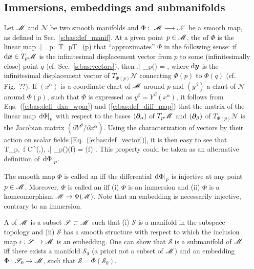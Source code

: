 \subsection{Immersions, embeddings and submanifolds} \label{s:bas:embed}

Let $\mathscr{M}$ and $\mathscr{N}$ be two smooth manifolds
and $\Phi:\ \mathscr{M} \longrightarrow \mathscr{N}$
be a smooth map, as defined in Sec.~\ref{s:bas:def_manif}.
At a given point $p\in\mathscr{M}$, the 
of $\Phi$ is the linear map
\be
    \left.\D\Phi \right| _p:\ T_p\M \longrightarrow T_{\Phi(p)}
\ee
that ``approximates'' $\Phi$ in the following sense: if $\mathrm{d}\bm{x}\in T_p\mathscr{M}$ is the
infinitesimal displacement vector from $p$ to some (infinitesimally close) point $q$
(cf. Sec.~\ref{s:bas:vectors}), then
\be \label{e:bas:def_diff_map}
    \left.\D\Phi \right| _p(\D{}) = \D{},
\ee
where $\mathrm{d}\bm{y}$ is the infinitesimal displacement vector of $T_{\Phi(p)}\mathscr{N}$
connecting $\Phi(p)$ to $\Phi(q)$ (cf. Fig.~??).
If $(x^\alpha)$ is a coordinate chart of $\mathscr{M}$ around $p$ and $(y^\beta)$ a chart
of $\mathscr{N}$ around $\Phi(p)$, such that $\Phi$ is expressed as
$y^\beta = Y^\beta(x^\alpha)$, it follows from Eqs.~(\ref{e:bas:dell_dxa_wpar}) and
(\ref{e:bas:def_diff_map}) that
the matrix of the linear map $\left.\mathrm{d}\Phi \right| _p$
with respect to the bases $(\bm{\partial}_\alpha)$ of $T_p\mathscr{M}$ and $(\bm{\partial}_\beta)$ of $T_{\Phi(p)}\mathscr{N}$
is the Jacobian matrix $(\partial Y^\beta / \partial x^\alpha)$.
Using the characterization of vectors by their action on scalar fields
[Eq.~(\ref{e:bas:def_vector})], it is then easy to see
that
\be
    \forall {}\in T_p\M,\ \forall f \in C^\infty(,),\quad
    \left.\D\Phi \right| _p()(f) =
        \left(f\circ \Phi \right) .
\ee
This property could be taken as an alternative definition of $\left.\mathrm{d}\Phi \right| _p$.

The smooth map $\Phi$ is called an  iff
the differential $\left.\mathrm{d}\Phi \right| _p$ is injective at any point $p\in\mathscr{M}$.
Moreover, $\Phi$ is called an  iff (i) $\Phi$
is an immersion and (ii) $\Phi$ is a homeomorphism $\mathscr{M} \rightarrow \Phi(\mathscr{M})$.
Note that an embedding is necessarily injective, contrary to an immersion.

A  of $\mathscr{M}$ is a subset $\mathscr{S}\subset \mathscr{M}$ such
that (i) $\mathscr{S}$ is a manifold in the subspace topology and (ii)
$\mathscr{S}$ has a smooth structure with respect to which
the inclusion map $\iota: \mathscr{S} \rightarrow \mathscr{M}$ is an embedding.
One can show that $\mathscr{S}$ is a submanifold of $\mathscr{M}$ iff there exists
a manifold $\mathscr{S}_0$ (a priori not a subset of $\mathscr{M}$) and an
embedding $\Phi: \mathscr{S}_0 \rightarrow \mathscr{M}$, such that
$\mathscr{S} = \Phi(\mathscr{S}_0)$.

